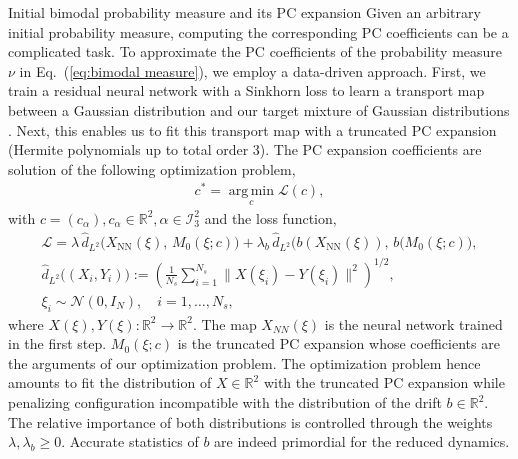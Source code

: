 \documentclass[11pt, a4paper, oneside, reqno]{amsart}
\makeatletter
\def\subsection{\@startsection{subsection}{2}%
	\z@{.5\linespacing\@plus.7\linespacing}{.5\linespacing}%
	{\normalfont\large\bfseries}}
\makeatother
\begin{document}
\subsection{Initial bimodal probability measure and its PC expansion}\label{app:bimodal}
\noindent Given an arbitrary initial probability measure, computing the corresponding PC coefficients can be a complicated task. 
To approximate the PC coefficients of the probability measure $\nu$ in Eq.~(\ref{eq:bimodal measure}), we employ a data-driven approach. 
First, we train a residual neural network with a Sinkhorn loss to learn a transport map between a Gaussian distribution and our target mixture of Gaussian distributions \cite{feydy2019interpolating,feydy2019geomloss}. 
Next, this enables us to fit this transport map with a truncated PC expansion (Hermite polynomials up to total order 3). 
The PC expansion coefficients are solution of 
the following optimization problem,  
\sloppy
\begin{eqnarray}
    c^* = \operatorname*{arg\,min}_{c} \mathcal{L}(c),
\end{eqnarray}
with $c=(c_\alpha), c_\alpha\in\mathbb{R}^2, \alpha\in\mathcal{I}_3^2$
and the loss function,
\begin{eqnarray}
    \mathcal{L} = \lambda\, \hat{d}_{L^2}\big(X_{\text{NN}}(\xi),\, M_0(\xi; c)\big)
     + \lambda_b\, \hat{d}_{L^2}\big(b(X_{\text{NN}}(\xi)),\, b(M_0(\xi; c)\big), \\
    \hat{d}_{L^2}\big((X_i, Y_i)\big) := \left( \frac{1}{N_s} \sum_{i=1}^{N_s} \| X(\xi_i) - Y(\xi_i) \|^2 \right)^{1/2}, \nonumber  \\
    \xi_i \sim \mathcal{N}(0, I_N), \quad i = 1, \dots, N_s, \nonumber 
\end{eqnarray}
where $X(\xi), Y(\xi): \mathbb{R}^2\rightarrow\mathbb{R}^2$.%
The map $X_{NN}(\xi)$ is the neural network trained in the first step. $M_0(\xi; c)$ is the truncated PC expansion whose coefficients are the arguments of our optimization problem. 
The optimization problem hence amounts to fit the distribution of $X\in\mathbb{R}^2$ with the truncated PC expansion while penalizing configuration incompatible with the distribution of the drift $b\in\mathbb{R}^2$. The relative importance of both distributions is controlled through the weights $\lambda,\lambda_b\geq0$. Accurate statistics of $b$ are indeed primordial for the reduced dynamics.
\end{document}

